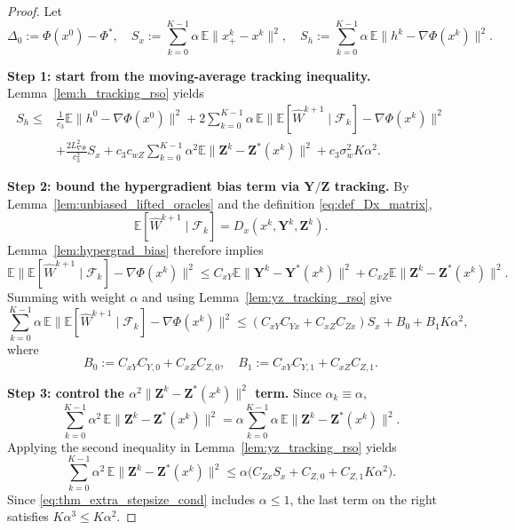 \documentclass{pkumelon}
\theoremstyle{plain}
\newcommand{\E}{\mathbb{E}}
\newcommand{\Phiobj}{\Phi}
\begin{document}
\begin{proof}
Let
\begin{equation*}
\Delta_0:=\Phiobj(x^0)-\Phiobj^*, \quad S_x:=\sum_{k=0}^{K-1}\alpha\,\E\|x_+^k-x^k\|^2, \quad S_h:=\sum_{k=0}^{K-1}\alpha\,\E\|h^k-\nabla\Phiobj(x^k)\|^2.
\end{equation*}

\textbf{Step 1: start from the moving-average tracking inequality. }
Lemma~\ref{lem:h_tracking_rso} yields
\begin{equation}\label{eq:thm_step1_h_track_product}
\begin{aligned}
S_h
\le{}&
\frac{1}{c_3}\E\|h^0-\nabla\Phiobj(x^0)\|^2+2\sum_{k=0}^{K-1}\alpha\,\E\|\E[\widehat W^{k+1}\mid\mathcal F_k]-\nabla\Phiobj(x^k)\|^2 \\
&+\frac{2L_{\nabla\Phi}^2}{c_3^2}S_x+c_3c_{wZ}\sum_{k=0}^{K-1}\alpha^2\E\|\boldsymbol Z^k-\boldsymbol Z^*(x^k)\|^2
+c_3\sigma_w^2K\alpha^2.
\end{aligned}
\end{equation}

\textbf{Step 2: bound the hypergradient bias term via $\boldsymbol Y/\boldsymbol Z$ tracking. }
By Lemma~\ref{lem:unbiased_lifted_oracles} and the definition \eqref{eq:def_Dx_matrix},
\begin{equation*}
\E[\widehat W^{k+1}\mid \mathcal F_k]=D_x(x^k,\boldsymbol Y^k,\boldsymbol Z^k).
\end{equation*}
Lemma~\ref{lem:hypergrad_bias} therefore implies
\begin{equation*}
\E\|\E[\widehat W^{k+1}\mid \mathcal F_k]-\nabla\Phiobj(x^k)\|^2 \le C_{xY}\E\|\boldsymbol Y^k-\boldsymbol Y^*(x^k)\|^2 +C_{xZ}\E\|\boldsymbol Z^k-\boldsymbol Z^*(x^k)\|^2.
\end{equation*}
Summing with weight $\alpha$ and using Lemma~\ref{lem:yz_tracking_rso} give
\begin{equation}\label{eq:bias_sum_product}
\sum_{k=0}^{K-1}\alpha\,\E\|\E[\widehat W^{k+1}\mid \mathcal F_k]-\nabla\Phiobj(x^k)\|^2
\le
(C_{xY}C_{Yx}+C_{xZ}C_{Zx})S_x+B_0+B_1K\alpha^2,
\end{equation}
where
\begin{equation*}
B_0:=C_{xY}C_{Y,0}+C_{xZ}C_{Z,0}, \quad B_1:=C_{xY}C_{Y,1}+C_{xZ}C_{Z,1}.
\end{equation*}

\textbf{Step 3: control the $\alpha^2\|\boldsymbol Z^k-\boldsymbol Z^*(x^k)\|^2$ term. }
Since $\alpha_k\equiv \alpha$,
\begin{equation*}
\sum_{k=0}^{K-1}\alpha^2\,\E\|\boldsymbol Z^k-\boldsymbol Z^*(x^k)\|^2 = \alpha\sum_{k=0}^{K-1}\alpha\,\E\|\boldsymbol Z^k-\boldsymbol Z^*(x^k)\|^2.
\end{equation*}
Applying the second inequality in Lemma~\ref{lem:yz_tracking_rso} yields
\begin{equation}\label{eq:alpha2_Z_bound_product_thm}
\sum_{k=0}^{K-1}\alpha^2\,\E\|\boldsymbol Z^k-\boldsymbol Z^*(x^k)\|^2
\le
\alpha\bigl(C_{Zx}S_x+C_{Z,0}+C_{Z,1}K\alpha^2\bigr).
\end{equation}
Since \eqref{eq:thm_extra_stepsize_cond} includes $\alpha\le 1$, the last term on the right satisfies $K\alpha^3\le K\alpha^2$.


\end{proof}
\end{document}

